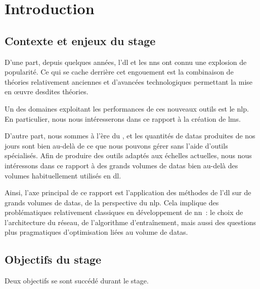 \chapter{Introduction}

\section[Contexte \& Enjeux]{Contexte et enjeux du stage}

D'une part, depuis quelques années, l'\gls{dl} et les \glspl{nn} ont connu une explosion de popularité.
Ce qui se cache derrière cet engouement est la combinaison de théories relativement anciennes et d'avancées technologiques permettant la mise en œuvre desdites théories.

Un des domaines exploitant les performances de ces nouveaux outils est le \gls{nlp}.
En particulier, nous nous intéresserons dans ce rapport à la création de \glspl{lm}.

D'autre part, nous sommes à l'ère du , et les quantités de \glspl{data} produites de nos jours sont bien au-delà de ce que nous pouvons gérer sans l'aide d'outils spécialisés.
Afin de produire des outils adaptés aux échelles actuelles, nous nous intéressons dans ce rapport à des grands volumes de \glspl{data} bien au-delà des volumes habituellement utilisés en \gls{dl}.

Ainsi, l'axe principal de ce rapport est l'application des méthodes de l'\gls{dl} sur de grands volumes de \glspl{data}, de la perspective du \gls{nlp}.
Cela implique des problématiques relativement classiques en développement de \gls{nn}~: le choix de l'architecture du réseau, de l'algorithme d'entraînement, mais aussi des questions plus pragmatiques d'optimisation liées au volume de \glspl{data}.

\section[Objectifs]{Objectifs du stage}
Deux objectifs se sont succédé durant le stage.

